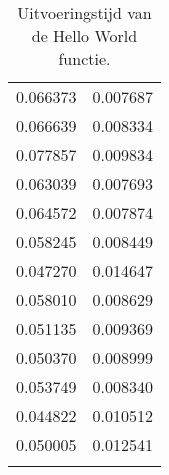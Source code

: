\begin{longtable}[c]{ll}
    0.066373 & 0.007687 \\
    0.066639 & 0.008334 \\
    0.077857 & 0.009834 \\
    0.063039 & 0.007693 \\
    0.064572 & 0.007874 \\
    0.058245 & 0.008449 \\
    0.047270 & 0.014647 \\
    0.058010 & 0.008629 \\
    0.051135 & 0.009369 \\
    0.050370 & 0.008999 \\
    0.053749 & 0.008340 \\
    0.044822 & 0.010512 \\
    0.050005 & 0.012541 \\
    \caption{Uitvoeringstijd van de Hello World functie.}
    \label{tab:uitvoeringstijd-hello-world}\\
\end{longtable}